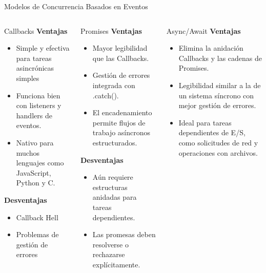 \documentclass[11pt]{beamer}
\begin{document}
	\begin{frame}{Modelos de Concurrencia Basados en Eventos}
		\tiny 
		\begin{columns}[T]
			\begin{block}{Callbacks}
				\textbf{Ventajas}
				\begin{itemize}
					\item Simple y efectiva para tareas asincrónicas simples
					\item Funciona bien con listeners y handlers de eventos.
					\item Nativo para muchos lenguajes como JavaScript, Python y C.
				\end{itemize}
				
				\vspace{0.1cm}
				\textbf{Desventajas}
				\begin{itemize}
					\item Callback Hell
					\item Problemas de gestión de errores
				\end{itemize}
			\end{block}
			
			
			\begin{block}{Promises}
				\textbf{Ventajas}
				\begin{itemize}
					\item Mayor legibilidad que las Callbacks.
					\item Gestión de errores integrada con .catch().
					\item El encadenamiento permite flujos de trabajo asíncronos estructurados.
				\end{itemize}
				
				\vspace{0.1cm}
				\textbf{Desventajas}
				\begin{itemize}
					\item Aún requiere estructuras anidadas para tareas dependientes.
					\item Las promesas deben resolverse o rechazarse explícitamente.
				\end{itemize}
			\end{block}
			
			
			
			\begin{block}{Async/Await}
				\textbf{Ventajas}
				\begin{itemize}
					\item Elimina la anidación Callbacks y las cadenas de Promises.
					\item Legibilidad similar a la de un sistema síncrono con mejor gestión de errores.
					\item Ideal para tareas dependientes de E/S, como solicitudes de red y operaciones con archivos.
				\end{itemize}
				

\end{block}
\end{columns}
\end{frame}
\end{document}
